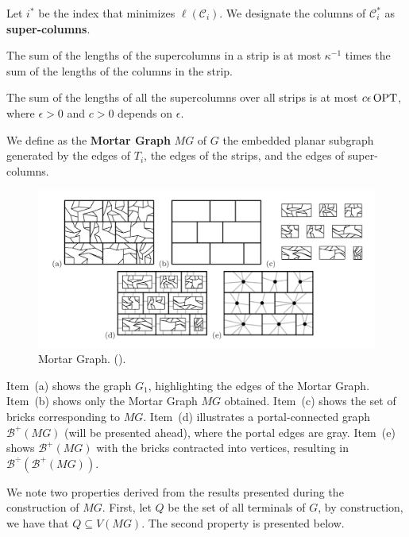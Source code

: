 Let \(i^\ast\) be the index that minimizes \(\ell(\mathcal{C}_i)\). We designate the columns of \(\mathcal{C}_i^\ast\) as \textbf{super-columns}.

\begin{lemma}
The sum of the lengths of the supercolumns in a strip is at most \(\kappa^{-1}\) times the sum of the lengths of the columns in the strip.
\end{lemma}

\begin{lemma} \label{borradaile_2009b_lemma_6_6}
     The sum of the lengths of all the supercolumns over all strips is at most \(c \epsilon \operatorname{\textrm{OPT}}\), where \(\epsilon > 0\) and \(c > 0\) depends on \(\epsilon\).
\end{lemma}

We define as the \textbf{Mortar Graph} \(MG\) of \(G\) the embedded planar subgraph generated by the edges of \(T_i\), the edges of the strips, and the edges of super-columns.

\begin{figure}[h]
    \centering
    \includegraphics[scale=0.4]{imgs/mortar3.png}
    \caption{Mortar Graph. (\cite{Borradaile2009b}).}
    \label{fig:mortar3}
\end{figure}

Item~(a) shows the graph \(G_1\), highlighting the edges of the Mortar Graph. 
Item~(b) shows only the Mortar Graph \(MG\) obtained. 
Item~(c) shows the set of bricks corresponding to \(MG\). 
Item~(d) illustrates a portal-connected graph \(\mathcal{B}^{+}(MG)\) (will be presented ahead), where the portal edges are gray. 
Item~(e) shows \(\mathcal{\mathcal{B}}^{+}(MG)\) with the bricks contracted into vertices, resulting in \(\mathcal{B}^{\div}(\mathcal{B }^{+}(MG))\).

We note two properties derived from the results presented during the construction of \(MG\). First, let \(Q\) be the set of all terminals of \(G\), by construction, we have that \(Q \subseteq V(MG)\). The second property is presented below.

